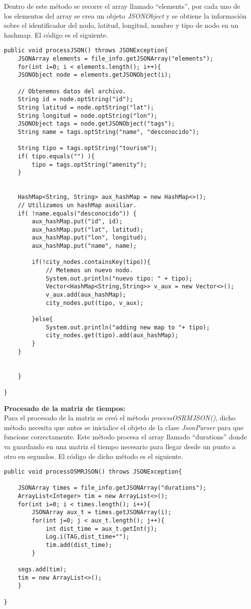 Dentro de este método se recorre el array llamado \enquote{elements}, por cada uno de los elementos del array se crea un objeto \textit{JSONObject} y se obtiene la información sobre el identificador del nodo, latitud, longitud, nombre y tipo de nodo en un hashmap. El código es el siguiente.\newline
\newpage
\begin{lstlisting}[caption=Función para procesar información sobre puntos de interés y alojamientos]
public void processJSON() throws JSONException{
	JSONArray elements = file_info.getJSONArray("elements");
	for(int i=0; i < elements.length(); i++){
	JSONObject node = elements.getJSONObject(i);
	
	// Obtenemos datos del archivo.
	String id = node.optString("id");
	String latitud = node.optString("lat");
	String longitud = node.optString("lon");
	JSONObject tags = node.getJSONObject("tags");
	String name = tags.optString("name", "desconocido");
	
	String tipo = tags.optString("tourism");
	if( tipo.equals("") ){
		tipo = tags.optString("amenity");
	}
	
	
	HashMap<String, String> aux_hashMap = new HashMap<>();
	// Utilizamos un hashMap auxiliar.
	if( !name.equals("desconocido")) {
		aux_hashMap.put("id", id);
		aux_hashMap.put("lat", latitud);
		aux_hashMap.put("lon", longitud);
		aux_hashMap.put("name", name);
		
		if(!city_nodes.containsKey(tipo)){
			// Metemos un nuevo nodo.
			System.out.println("nuevo tipo: " + tipo);
			Vector<HashMap<String,String>> v_aux = new Vector<>();
			v_aux.add(aux_hashMap);
			city_nodes.put(tipo, v_aux);
		
		}else{
			System.out.println("adding new map to "+ tipo);
			city_nodes.get(tipo).add(aux_hashMap);
		}
	}
	
	
	}

}
\end{lstlisting}
\vspace{0.06in}
\textbf{Procesado de la matriz de tiempos:}\\
Para el procesado de la matriz se creó el método \textit{processOSRMJSON()}, dicho método necesita que antes se inicialice el objeto de la clase \textit{JsonParser} para que funcione correctamente.
Este método procesa el array llamado \enquote{durations} donde va guardando en una matriz el tiempo necesario para llegar desde un punto a otro en segundos. El código de dicho método es el siguiente.
\newpage
\begin{lstlisting}[caption=Función para procesar matriz de tiempos entre puntos]
public void processOSMRJSON() throws JSONException{

	JSONArray times = file_info.getJSONArray("durations");
	ArrayList<Integer> tim = new ArrayList<>();
	for(int i=0; i < times.length(); i++){
		JSONArray aux_t = times.getJSONArray(i);
		for(int j=0; j < aux_t.length(); j++){
			int dist_time = aux_t.getInt(j);
			Log.i(TAG,dist_time+"");
			tim.add(dist_time);
		}
	
	segs.add(tim);
	tim = new ArrayList<>();
	}

}
\end{lstlisting}
